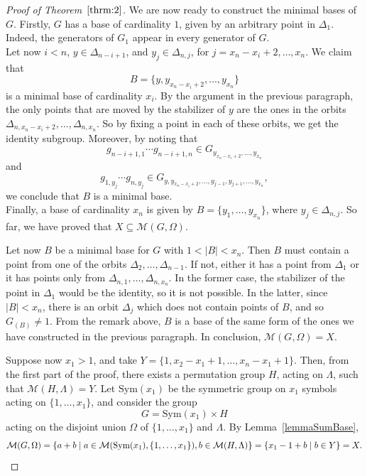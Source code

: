 \documentclass{amsart}
\begin{document}
\begin{proof}[Proof of Theorem~$\ref{thrm:2}$]
	We are now ready to construct the minimal bases of $G$. Firstly, $G$ has a base of cardinality $1$, given by an arbitrary point in $\Delta_1$. Indeed, the generators of $G_1$ appear in every generator of $G$.\\ 
	Let now $i < n$, $y \in \Delta_{n-i+1}$, and $y_j \in \Delta_{n,j}$, for $j=x_n-x_i+2,\dots,x_n$. We claim that $$B=\{y,y_{x_n-x_i+2},\dots,y_{x_n}\}$$ is a minimal base of cardinality $x_i$. By the argument in the previous paragraph, the only points that are moved by the stabilizer of $y$ are the ones in the orbits $\Delta_{n,x_n-x_i+2}, \dots, \Delta_{n,x_n}$. So by fixing a point in each of these orbits, we get the identity subgroup. Moreover, by noting that  $$g_{n-i+1,1}\cdots g_{n-i+1,n} \in G_{y_{x_n-x_i+2},\dots,y_{x_n}}$$ and $$g_{1,y_j} \cdots g_{n,y_j} \in G_{y,y_{x_n-x_i+2},\dots,y_{j-1},y_{j+1},\dots,y_{x_n}},$$ we conclude that $B$ is a minimal base.\\ Finally, a base of cardinality $x_n$ is given by $B = \{ y_1, \dots, y_{x_n}\}$, where $y_{j} \in \Delta_{n,j}$.  So far, we have proved that $X \subseteq \mathcal{M}(G,\Omega)$. 
	
	Let now $B$ be a minimal base for $G$ with $1 < |B| < x_n$. Then $B$ must contain a point from one of the orbits $\Delta_2,\dots, \Delta_{n-1}$. If not, either it has a point from $\Delta_1$  or it has points only from $\Delta_{n,1},\dots,\Delta_{n,x_n}$. In the former case, the stabilizer of the point in $\Delta_1$ would be the identity, so it is not possible. In the latter, since $|B| < x_n$, there is an orbit $\Delta_j$ which does not contain points of $B$, and so $G_{(B)} \neq 1$. From the remark above, $B$ is a base of the same form of the ones we have constructed in the previous paragraph. In conclusion, $\mathcal{M}(G,\Omega) = X$.
	
	Suppose now $x_1 > 1$, and take $Y=\{1, x_2-x_1+1, \dots, x_n-x_1+1\}$. Then, from the first part of the proof, there exists a permutation group $H$, acting on $\Lambda$, such that $\mathcal{M}(H,\Lambda) = Y$. Let $\mathrm{Sym}(x_1)$ be the symmetric group on $x_1$ symbols acting on $\{1,\dots,x_1\}$, and consider the group
	\[
	G = \mathrm{Sym}(x_1) \times H
	\]
	acting on the disjoint union $\Omega$ of $\{1,\dots, x_1\}$ and $\Lambda$. By Lemma~\ref{lemmaSumBase},
		$$\mathcal{M}(G,\Omega) =\{a+b\mid a\in \mathcal{M}(\mathrm{Sym}(x_1),\{1,\ldots,x_1\}), b\in \mathcal{M}(H,\Lambda)\}=\{x_1-1+b\mid b\in Y\}=X.\qedhere$$
	\end{proof}
	
\end{document}
